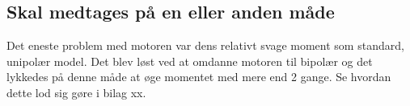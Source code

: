 \subsection{Skal medtages på en eller anden måde}

Det eneste problem med motoren var dens relativt svage moment som standard, unipolær model. Det blev løst ved at omdanne motoren til bipolær og det lykkedes på denne måde at øge momentet med mere end 2 gange. Se hvordan dette lod sig gøre i bilag xx.\\